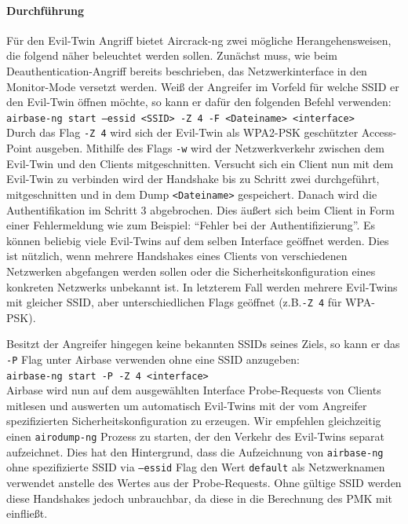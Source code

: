 \paragraph{Durchführung}
Für den Evil-Twin Angriff bietet Aircrack-ng zwei mögliche Herangehensweisen, die folgend näher beleuchtet werden sollen.
Zunächst muss, wie beim Deauthentication-Angriff bereits beschrieben, das Netzwerkinterface in den Monitor-Mode versetzt werden.
Weiß der Angreifer im Vorfeld für welche SSID er den Evil-Twin öffnen möchte, so kann er dafür den folgenden Befehl verwenden:
\\\texttt{airbase-ng start --essid <SSID> -Z 4 -F <Dateiname> <interface>}\\
Durch das Flag \texttt{-Z 4} wird sich der Evil-Twin als WPA2-PSK geschützter Access-Point ausgeben.
Mithilfe des Flags \texttt{-w} wird der Netzwerkverkehr zwischen dem Evil-Twin und den Clients mitgeschnitten.
Versucht sich ein Client nun mit dem Evil-Twin zu verbinden wird der Handshake bis zu Schritt zwei durchgeführt, mitgeschnitten und in dem Dump \texttt{<Dateiname>} gespeichert.
Danach wird die Authentifikation im Schritt 3 abgebrochen.
Dies äußert sich beim Client in Form einer Fehlermeldung wie zum Beispiel: \enquote{Fehler bei der Authentifizierung}.
Es können beliebig viele Evil-Twins auf dem selben Interface geöffnet werden. 
Dies ist nützlich, wenn mehrere Handshakes eines Clients von verschiedenen Netzwerken abgefangen werden sollen oder die Sicherheitskonfiguration eines konkreten Netzwerks unbekannt ist.
In letzterem Fall werden mehrere Evil-Twins mit gleicher SSID, aber unterschiedlichen Flags geöffnet (z.B.\texttt{-Z 4} für WPA-PSK). %


Besitzt der Angreifer hingegen keine bekannten SSIDs seines Ziels, so kann er das \texttt{-P} Flag unter Airbase verwenden ohne eine SSID anzugeben:
\\\texttt{airbase-ng start -P -Z 4 <interface>}\\
Airbase wird nun auf dem ausgewählten Interface Probe-Requests von Clients mitlesen und auswerten um automatisch Evil-Twins mit der vom Angreifer spezifizierten Sicherheitskonfiguration zu erzeugen.
Wir empfehlen gleichzeitig einen \texttt{airodump-ng} Prozess zu starten, der den Verkehr des Evil-Twins separat aufzeichnet.
Dies hat den Hintergrund, dass die Aufzeichnung von \texttt{airbase-ng} ohne spezifizierte SSID via \texttt{--essid} Flag den Wert \texttt{default} als Netzwerknamen verwendet anstelle des Wertes aus der Probe-Requests.
Ohne gültige SSID werden diese Handshakes jedoch unbrauchbar, da diese in die Berechnung des PMK mit einfließt.

